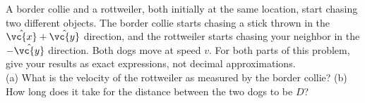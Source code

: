 A border collie and a rottweiler, both initially at the same
location, start chasing two different objects. The border collie
starts chasing a stick thrown in the $\hat{\vc{x}} + \hat{\vc{y}}$ direction, and
the rottweiler starts chasing your neighbor in the $-\hat{\vc{y}}$
direction. Both dogs move at speed $v$. For both parts of this problem,
give your results as exact expressions, not decimal approximations.\\
%
(a) What is the velocity of the rottweiler as measured by the border
collie?\answercheck\hwendpart
%
(b) How long does it take for the distance between the two dogs to be
$D$?\answercheck
